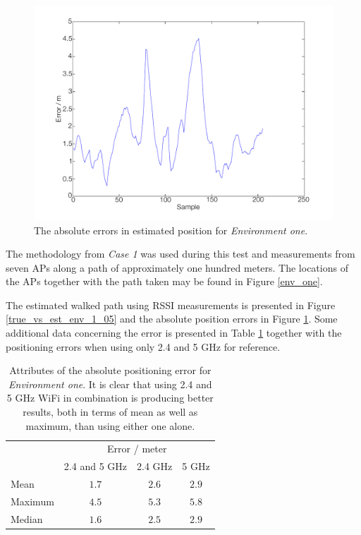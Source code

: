 \documentclass{LTHthesis}
\begin{document}
%
\begin{figure}[!hbt]

\includegraphics[width=1\textwidth ]{images/pure_rssi/error_env_1_05}
\caption{The absolute errors in estimated position for \emph{Environment one}.}\label{error_env_1_05}
\end{figure}
%
The methodology from \emph{Case 1} was used during this test and measurements from seven APs along a path of approximately one hundred meters. The locations of the APs together with the path taken may be found in Figure \ref{env_one}.

The estimated walked path using RSSI measurements is presented in Figure \ref{true_vs_est_env_1_05} and the absolute position errors in Figure \ref{error_env_1_05}. Some additional data concerning the error is presented in Table \ref{table:error_env-1} together with the positioning errors when using only 2.4 and 5 GHz for reference.
%
\begin{table}[!hbt]
\begin{center}
\begin{tabular}{|l|c|c|c|}
\cline{2-4}
\multicolumn{1}{c|}{} & \multicolumn{3}{c|}{Error / meter} \\
\cline{2-4}
\multicolumn{1}{c|}{} & 2.4 and 5 GHz & 2.4 GHz & 5 GHz \\
\hline
Mean & $1.7$ & $2.6$ & $2.9$ \\
\hline
Maximum & $4.5$ & $5.3$ & $5.8$\\
\hline
Median & $1.6$ & $2.5$ & $2.9$ \\
\hline 
\end{tabular}
\end{center}
\caption{Attributes of the absolute positioning error for \emph{Environment one}. It is clear that using 2.4 and 5 GHz WiFi in combination is producing better results, both in terms of mean as well as maximum, than using either one alone.}\label{table:error_env-1}
\end{table}
\end{document}
